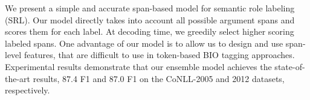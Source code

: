 We present a simple and accurate span-based model for semantic role labeling (SRL). Our model directly takes into account all possible argument spans and scores them for each label. At decoding time, we greedily select higher scoring labeled spans. One advantage of our model is to allow us to design and use span-level features, that are difficult to use in token-based BIO tagging approaches. Experimental results demonstrate that our ensemble model achieves the state-of-the-art results, 87.4 F1 and 87.0 F1 on the CoNLL-2005 and 2012 datasets, respectively.
